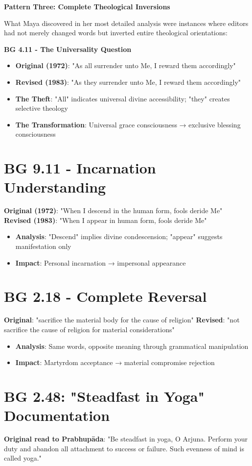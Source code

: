 \documentclass[11pt,twoside]{book}
\begin{document}
\textbf{\textbf{Pattern Three: Complete Theological Inversions}}

What Maya discovered in her most detailed analysis were instances where editors had not merely changed words but inverted entire theological orientations:

\textbf{\textbf{BG 4.11 - The Universality Question}}
\begin{itemize}
\item \textbf{\textbf{Original (1972)}}: "As all surrender unto Me, I reward them accordingly"
\item \textbf{\textbf{Revised (1983)}}: "As they surrender unto Me, I reward them accordingly"
\item \textbf{\textbf{The Theft}}: "All" indicates universal divine accessibility; "they" creates selective theology
\item \textbf{\textbf{The Transformation}}: Universal grace consciousness → exclusive blessing consciousness
\end{itemize}
\section*{BG 9.11 - Incarnation Understanding}
\label{sec:orga57ffae}
\textbf{\textbf{Original (1972)}}: "When I descend in the human form, fools deride Me"
\textbf{\textbf{Revised (1983)}}: "When I appear in human form, fools deride Me"
\begin{itemize}
\item \textbf{\textbf{Analysis}}: "Descend" implies divine condescension; "appear" suggests manifestation only
\item \textbf{\textbf{Impact}}: Personal incarnation → impersonal appearance
\end{itemize}
\section*{BG 2.18 - Complete Reversal}
\label{sec:orge9b9f2b}
\textbf{\textbf{Original}}: "sacrifice the material body for the cause of religion" 
\textbf{\textbf{Revised}}: "not sacrifice the cause of religion for material considerations"
\begin{itemize}
\item \textbf{\textbf{Analysis}}: Same words, opposite meaning through grammatical manipulation
\item \textbf{\textbf{Impact}}: Martyrdom acceptance → material compromise rejection
\end{itemize}
\section*{BG 2.48: "Steadfast in Yoga" Documentation}
\label{sec:org9f29c68}
\textbf{\textbf{Original read to Prabhupāda}}: "Be steadfast in yoga, O Arjuna. Perform your duty and abandon all attachment to success or failure. Such evenness of mind is called yoga."
\end{document}

